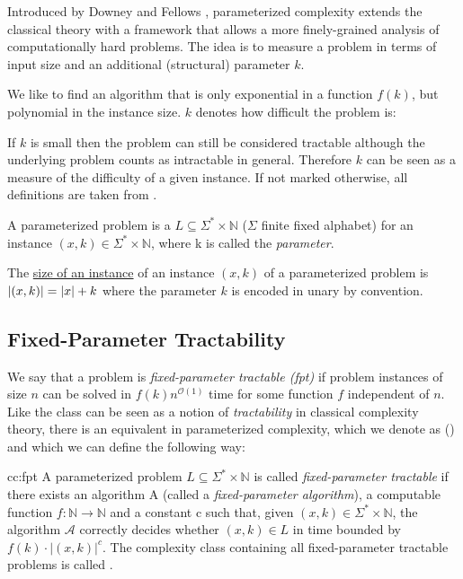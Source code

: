 Introduced by Downey and Fellows \cite{Downey1999a}, parameterized complexity extends the classical theory with a framework that allows a more finely-grained analysis of computationally hard problems. 
The idea is to measure a problem in terms of input size and an additional (structural) parameter $k$. 

We like to find an algorithm that is only exponential in a function $f(k)$, but polynomial in the instance size.
$k$ denotes how difficult the problem is: 

If $k$ is small then the problem can still be considered tractable although the underlying \NPh problem counts as intractable in general.
Therefore $k$ can be seen as a measure of the difficulty of a given instance.
If not marked otherwise, all definitions are taken from \cite{Cygan2015}.


\begin{definition}
    A parameterized problem is a $L\subseteq\Sigma^*\times \mathbb{N}$ ($\Sigma$ finite fixed alphabet) for an instance $(x,k)\in \Sigma^*\times \mathbb{N}$, where k is called the \textit{parameter}.

    The \underline{size of an instance} of an instance $(x,k)$ of a parameterized problem is $\abs{(x,k)} = \abs{x} + k$ where the parameter $k$ is encoded in unary by convention.
\end{definition}

\subsection{Fixed-Parameter Tractability}
We say that a problem is \textit{fixed-parameter tractable (fpt)} if problem instances of size $n$ can be solved in $f(k)n^{\mathcal{O}(1)}$ time for some function $f$ independent of $n$. 
Like the class \Pt can be seen as a notion of \textit{tractability} in classical complexity theory, there is an equivalent in parameterized complexity, which we denote as \FPTl (\FPT) and which we can define the following way:

\begin{cc} {cc:fpt}
    A parameterized problem $L\subseteq\Sigma^*\times\mathbb{N}$ is called \textit{fixed-parameter tractable} if there exists an algorithm A (called a \textit{fixed-parameter algorithm}), a computable function $f:\mathbb{N} \rightarrow \mathbb{N}$ and a constant c such that, given $(x,k) \in \Sigma^* \times \mathbb{N}$, the algorithm $\mathcal{A}$ correctly decides whether $(x,k) \in L$ in time bounded by $f(k) \cdot |(x,k)|^c$. The complexity class containing all fixed-parameter tractable problems is called \FPT.
\end{cc}
